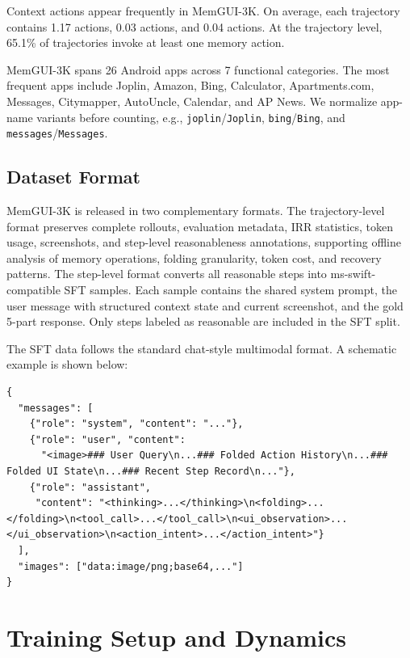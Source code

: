 Context actions appear frequently in MemGUI-3K. On average, each trajectory contains 1.17  actions, 0.03  actions, and 0.04  actions. At the trajectory level, 65.1\% of trajectories invoke at least one memory action.

MemGUI-3K spans 26 Android apps across 7 functional categories. The most frequent apps include Joplin, Amazon, Bing, Calculator, Apartments.com, Messages, Citymapper, AutoUncle, Calendar, and AP News. We normalize app-name variants before counting, e.g., \texttt{joplin}/\texttt{Joplin}, \texttt{bing}/\texttt{Bing}, and \texttt{messages}/\texttt{Messages}.

\subsection{Dataset Format}
\label{sec:appendix-dataset-format}

MemGUI-3K is released in two complementary formats. The trajectory-level format preserves complete rollouts, evaluation metadata, IRR statistics, token usage, screenshots, and step-level reasonableness annotations, supporting offline analysis of memory operations, folding granularity, token cost, and recovery patterns. The step-level format converts all reasonable steps into ms-swift-compatible SFT samples. Each sample contains the shared system prompt, the user message with structured context state and current screenshot, and the gold 5-part \conact response. Only steps labeled as reasonable are included in the SFT split.

The SFT data follows the standard chat-style multimodal format. A schematic example is shown below:
\begin{Verbatim}[fontsize=\scriptsize,breaklines,breakanywhere]
{
  "messages": [
    {"role": "system", "content": "..."},
    {"role": "user", "content":
      "<image>### User Query\n...### Folded Action History\n...### Folded UI State\n...### Recent Step Record\n..."},
    {"role": "assistant",
     "content": "<thinking>...</thinking>\n<folding>...</folding>\n<tool_call>...</tool_call>\n<ui_observation>...</ui_observation>\n<action_intent>...</action_intent>"}
  ],
  "images": ["data:image/png;base64,..."]
}
\end{Verbatim}

\section{Training Setup and Dynamics}
\label{sec:appendix-train}


